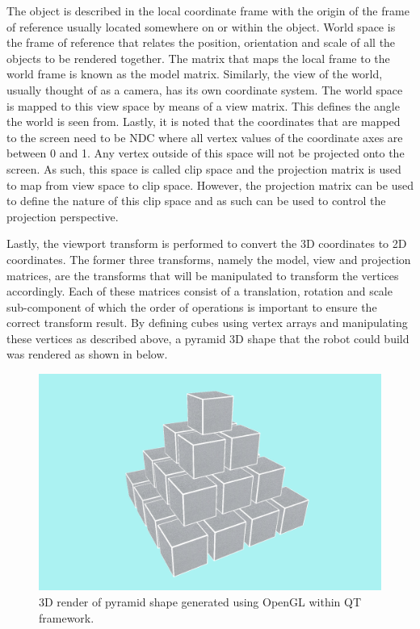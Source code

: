 The object is described in the local coordinate frame with the origin of the frame of reference usually located somewhere on or within the object. World space is the frame of reference that relates the position, orientation and scale of all the objects to be rendered together. The matrix that maps the local frame to the world frame is known as the model matrix. Similarly, the view of the world, usually thought of as a camera, has its own coordinate system. The world space is mapped to this view space by means of a view matrix. This defines the angle the world is seen from. Lastly, it is noted that the coordinates that are mapped to the screen need to be \ac{NDC} where all vertex values of the coordinate axes are between 0 and 1. Any vertex outside of this space will not be projected onto the screen. As such, this space is called clip space and the projection matrix is used to map from view space to clip space. However, the projection matrix can be used to define the nature of this clip space and as such can be used to control the projection perspective. 

Lastly, the viewport transform is performed to convert the 3D coordinates to 2D coordinates. The former three transforms, namely the model, view and projection matrices, are the transforms that will be manipulated to transform the vertices accordingly. Each of these matrices consist of a translation, rotation and scale sub-component of which the order of operations is important to ensure the correct transform result. By defining cubes using vertex arrays and manipulating these vertices as described above, a pyramid 3D shape that the robot could build was rendered as shown in  below.

\begin{figure}[H]
	\centering
	\includegraphics[width=0.8\linewidth]{figures/202110/initial-opengl-shape.PNG}
	\caption{3D render of pyramid shape generated using OpenGL within QT framework.}
	\label{fig:initial-opengl}
\end{figure}

